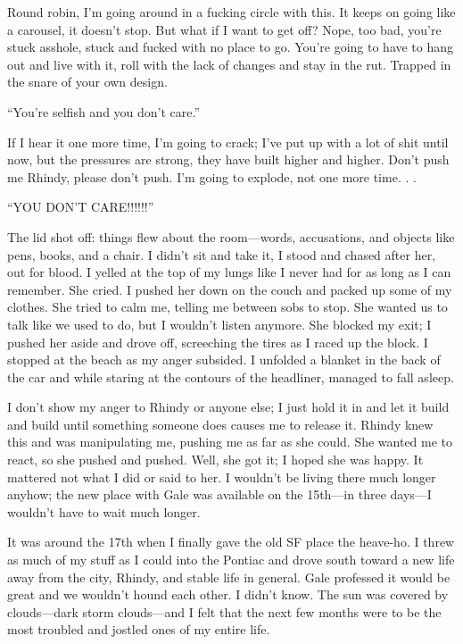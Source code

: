 Round robin, I'm going around in a fucking circle with this. It keeps on
going like a carousel, it doesn't stop. But what if I want to get off?
Nope, too bad, you're stuck asshole, stuck and fucked with no place to
go. You're going to have to hang out and live with it, roll with the
lack of changes and stay in the rut. Trapped in the snare of your own
design.

``You're selfish and you don't care.''

If I hear it one more time, I'm going to crack; I've put up with a lot
of shit until now, but the pressures are strong, they have built higher
and higher. Don't push me Rhindy, please don't push. I'm going to
explode, not one more time. . .

``YOU DON'T CARE!!!!!!''

The lid shot off: things flew about the room---words, accusations, and
objects like pens, books, and a chair. I didn't sit and take it, I stood
and chased after her, out for blood. I yelled at the top of my lungs
like I never had for as long as I can remember. She cried. I pushed her
down on the couch and packed up some of my clothes. She tried to calm
me, telling me between sobs to stop. She wanted us to talk like we used
to do, but I wouldn't listen anymore. She blocked my exit; I pushed her
aside and drove off, screeching the tires as I raced up the block. I
stopped at the beach as my anger subsided. I unfolded a blanket in the
back of the car and while staring at the contours of the headliner,
managed to fall asleep.

I don't show my anger to Rhindy or anyone else; I just hold it in and
let it build and build until something someone does causes me to release
it. Rhindy knew this and was manipulating me, pushing me as far as she
could. She wanted me to react, so she pushed and pushed. Well, she got
it; I hoped she was happy. It mattered not what I did or said to her. I
wouldn't be living there much longer anyhow; the new place with Gale was
available on the 15th---in three days---I wouldn't have to wait much
longer.

It was around the 17th when I finally gave the old SF place the
heave-ho. I threw as much of my stuff as I could into the Pontiac and
drove south toward a new life away from the city, Rhindy, and stable
life in general. Gale professed it would be great and we wouldn't hound
each other. I didn't know. The sun was covered by clouds---dark storm
clouds---and I felt that the next few months were to be the most
troubled and jostled ones of my entire life.


